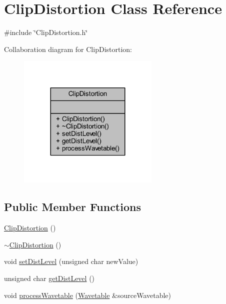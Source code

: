 \hypertarget{class_clip_distortion}{}\section{Clip\+Distortion Class Reference}
\label{class_clip_distortion}


{\ttfamily \#include \char`\"{}Clip\+Distortion.\+h\char`\"{}}



Collaboration diagram for Clip\+Distortion\+:
\nopagebreak
\begin{figure}[H]
\begin{center}
\leavevmode
\includegraphics[width=191pt]{d8/d25/class_clip_distortion__coll__graph}
\end{center}
\end{figure}
\subsection*{Public Member Functions}
\begin{DoxyCompactItemize}
\item 
\hyperlink{class_clip_distortion_a86506486f99934a97cd2de7cceee3f0d}{Clip\+Distortion} ()
\item 
\hyperlink{class_clip_distortion_a4128fd1ee6344103f10499bd97ab157f}{$\sim$\+Clip\+Distortion} ()
\item 
void \hyperlink{class_clip_distortion_a1fe19163beb22de83c8adff0e6447bc8}{set\+Dist\+Level} (unsigned char new\+Value)
\item 
unsigned char \hyperlink{class_clip_distortion_a2a2656f1baaaa42f9c240040ecee9c68}{get\+Dist\+Level} ()
\item 
void \hyperlink{class_clip_distortion_a761af22fbd15eb8bcc9ac0fdfe4d655d}{process\+Wavetable} (\hyperlink{class_wavetable}{Wavetable} \&source\+Wavetable)
\end{DoxyCompactItemize}


